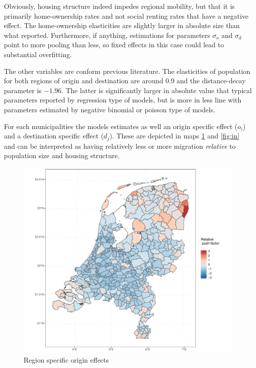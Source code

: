 \documentclass[fleqn,10pt]{SelfArx} %
\begin{document}
{{Obviously, housing structure indeed impedes regional mobility, but that it is primarily 
home-ownership rates and not social renting rates that have a negative
effect. The home-ownership elasticities are slightly larger in absolute
size than what \citet{amirault2016drags} reported. Furthermore, if anything, 
estimations for parameters $\sigma_o$ and $\sigma_d$ point to more
pooling than less, so fixed effects in this case could lead to
substantial overfitting. 

The other variables are conform previous literature. The elasticities of population for both regions of origin and destination are around 0.9 and the distance-decay parameter is $-1.96$. The latter is significantly larger in absolute value that typical parameters reported by regression type of models, but is more in less line with parameters estimated by negative binomial or poisson type of models. 

For each municipalities the models estimates as well an origin specific effect ($o_i$) and a destination specific effect ($d_j$). These are depicted in maps \ref{fig:out} and \ref{fig:in} and can be interpreted as having relatively less or more migration \emph{relative} to population size and housing structure.

\begin{figure}[h!]
		\centering
		\includegraphics[width = \columnwidth]{../fig/p_coef_out.pdf}
		\caption{Region specific origin effects}\label{fig:out}
\end{figure}

}}
\end{document}
